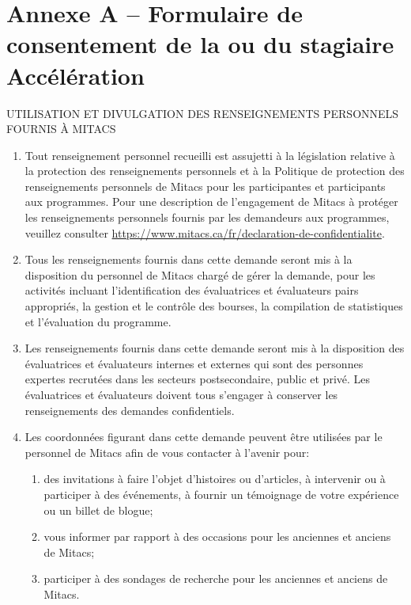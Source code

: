 \section*{Annexe A – Formulaire de consentement de la ou du stagiaire Accélération\oblig}

{
\bfseries
\begin{center}
\MakeUppercase{Utilisation et divulgation des renseignements personnels fournis à Mitacs}
\end{center}

\begin{enumerate}
\item Tout renseignement personnel recueilli est assujetti à la législation relative à la protection des renseignements personnels et à la Politique de protection des renseignements personnels de Mitacs pour les participantes et participants aux programmes. Pour une description de l'engagement de Mitacs à protéger les renseignements personnels fournis par les demandeurs aux programmes, veuillez consulter \url{https://www.mitacs.ca/fr/declaration-de-confidentialite}.
\item Tous les renseignements fournis dans cette demande seront mis à la disposition du personnel de Mitacs chargé de gérer la demande, pour les activités incluant l'identification des évaluatrices et évaluateurs pairs appropriés, la gestion et le contrôle des bourses, la compilation de statistiques et l'évaluation du programme.
\item Les renseignements fournis dans cette demande seront mis à la disposition des évaluatrices et évaluateurs internes et externes qui sont des personnes expertes recrutées dans les secteurs postsecondaire, public et privé. Les évaluatrices et évaluateurs doivent tous s'engager à conserver les renseignements des demandes confidentiels.
\item Les coordonnées figurant dans cette demande peuvent être utilisées par le personnel de Mitacs afin de vous contacter à l'avenir pour:
\begin{enumerate}
\item des invitations à faire l'objet d'histoires ou d'articles, à intervenir ou à participer à des événements, à fournir un témoignage de votre expérience ou un billet de blogue;
\item vous informer par rapport à des occasions pour les anciennes et anciens de Mitacs;
\item participer à des sondages de recherche pour les anciennes et anciens de Mitacs.
\end{enumerate}

\end{enumerate}}

